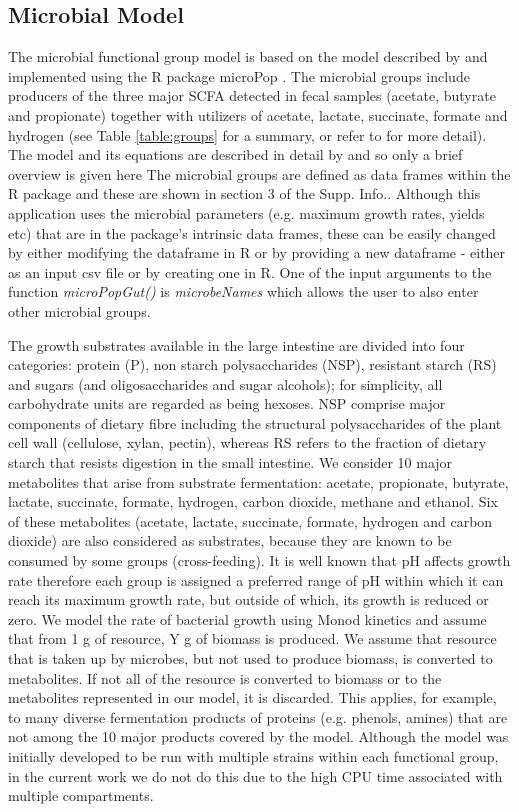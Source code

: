 \documentclass[a4paper]{article}
\begin{document}
\subsection*{Microbial Model}
The microbial functional group model is based on the model described by \cite{Kettle2015} and implemented using the R package microPop \citep{Kettle2018}.
The microbial groups include producers of the three major SCFA detected in fecal samples (acetate, butyrate and propionate) together with utilizers of acetate, lactate, succinate, formate and hydrogen (see Table \ref{table:groups} for a summary, or refer to \cite{Kettle2015} for more detail).
The model and its equations are described in detail by \cite{Kettle2015} and \cite{Kettle2018} so only a brief overview is given here
The microbial groups are defined as data frames within the R package and these are shown in section 3 of the Supp. Info..
Although this application uses the microbial parameters (e.g. maximum growth rates, yields etc) that are in the package's intrinsic data frames, these can be easily changed by either modifying the dataframe in R or by providing a new dataframe - either as an input csv file or by creating one in R. One of the input arguments to the function \textit{microPopGut()} is \textit{microbeNames} which allows the user to also enter other microbial groups.    


The growth substrates available in the large intestine are divided into four categories: protein (P), non starch polysaccharides (NSP), resistant starch (RS) and sugars (and oligosaccharides and sugar alcohols); for simplicity, all carbohydrate units are regarded as being hexoses. NSP comprise major components of dietary fibre including the structural polysaccharides of the plant cell wall (cellulose, xylan, pectin), whereas RS refers to the fraction of dietary starch that resists digestion in the small intestine.
We consider 10 major metabolites that arise from substrate fermentation: acetate, propionate, butyrate, lactate, succinate, formate, hydrogen, carbon dioxide, methane and ethanol. Six of these metabolites (acetate, lactate, succinate, formate, hydrogen and carbon dioxide) are also considered as substrates, because they are known to be consumed by some groups (cross-feeding). 
It is well known that pH affects growth rate therefore each group is assigned a preferred range of pH within which it can reach its maximum growth rate, but outside of which, its growth is reduced or zero.
We model the rate of bacterial growth using Monod kinetics and assume that from 1 g of resource, Y g of biomass is produced. We assume that resource that is taken up by microbes, but not used to produce biomass, is converted to metabolites. If not all of the resource is converted to biomass or to the metabolites represented in our model, it is discarded. This applies, for example, to many diverse fermentation products of proteins (e.g. phenols, amines) that are not among the 10 major products covered by the model. 
Although the model was initially developed to be run with multiple strains within each functional group, in the current work we do not do this due to the high CPU time associated with multiple compartments.
\end{document}
